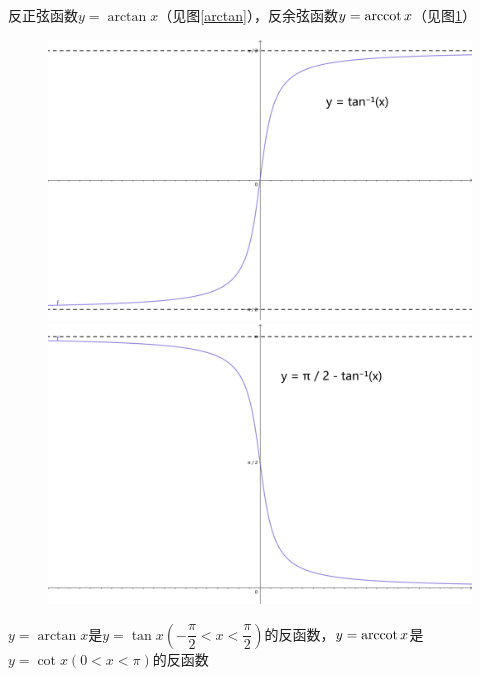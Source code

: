 反正弦函数$y=\arctan x$（见图\ref{arctan}），反余弦函数$y=\mathrm{arccot}\, x$（见图\ref{arccot}）
\begin{figure}[H]
\centering
\begin{minipage}{0.4\linewidth}
    \centerline{\includegraphics[width=\textwidth]{figure/arctan_plot.png}}
    \caption{} \label{arctan}
\end{minipage}
    \qquad
\begin{minipage}{0.4\linewidth}
    \centerline{\includegraphics[width=\textwidth]{figure/arccot_plot.png}}
    \caption{} \label{arccot}
\end{minipage}
\end{figure}

$y=\arctan x$是$y=\tan x\left(-\dfrac{\pi}{2}< x< \dfrac{\pi}{2}\right)$的反函数，$y=\mathrm{arccot}\, x$是$y=\cot x(0< x< \pi)$的反函数

